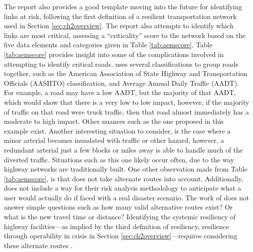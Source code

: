 The \citeauthor{aem2017} report also provides a good template moving into the future for identifying
links at risk,
following the first definition of a resilient transportation network used in Section \ref{sec:ch2overview}. The
report also attempts to
identify which links are most critical, assessing a “criticality”
score to the network
based on the five data elements and categories given in Table \ref{tab:aemscore}.
Table \ref{tab:aemscore} provides insight into some of the complications involved in
attempting to identify critical roads. \citeauthor{aem2017} uses several classifications to group
roads together, such as the American Association of State Highway and Transportation
Officials (AASHTO) classification, and Average Annual Daily Traffic (AADT). For example, a road may have a low AADT, but
the majority of that AADT, which would show that there is a very low to low impact,
however, if the majority of traffic on that road were truck traffic, then that road almost
immediately has a moderate to high impact. Other nuances such as the one proposed in this
example exist. Another interesting situation to consider, is the case where a minor arterial becomes inundated with traffic or other hazard, however, a redundant arterial just a few blocks or miles away is able to handle much of the diverted traffic. Situations such as this one likely occur often, due to the way highway networks are traditionally built. One other observation made from Table
\ref{tab:aemscore}, is that \citeauthor{aem2017} does not take alternate routes into account.
Additionally, \citeauthor{aem2017} does not include a way for their risk analysis methodology
to anticipate what a user would actually do if faced with a real disaster
scenario. The work of \citeauthor{aem2017} does not answer simple questions such as how many valid
alternative routes exist? Or what is the new travel time or distance?
Identifying the systemic resiliency of highway facilities---as implied by the third definition of resiliency, resilience through
operability in crisis in Section \ref{sec:ch2overview}---requires considering these alternate routes \citep{aem2017}.


